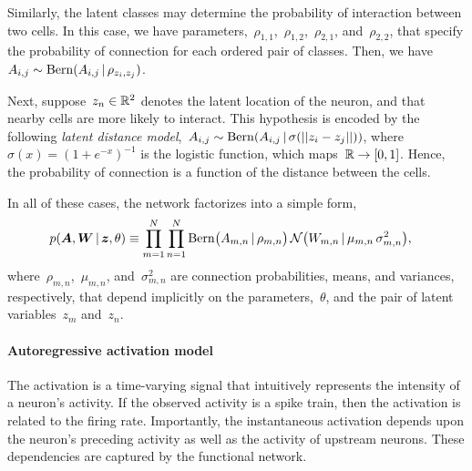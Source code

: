 Similarly, the latent classes may determine the probability of interaction between two cells. In this case, we have parameters,~$\rho_{1,1}$,~$\rho_{1,2}$,~$\rho_{2,1}$, and~$\rho_{2,2}$, that specify the probability of connection for each ordered pair of classes.
Then, we have~$A_{i,j} \sim \mathrm{Bern}(A_{i,j} \,|\, \rho_{z_i, z_j})$.

Next, suppose~$z_n \in \mathbb{R}^2$ denotes the latent location of the neuron, and that nearby cells are more likely to interact. 
This hypothesis is encoded by the following \emph{latent distance model},~${A_{i,j} \sim \mathrm{Bern}(A_{i,j} \,|\, \sigma(||z_i - z_j||))}$, where~$\sigma(x)=(1+e^{-x})^{-1}$ is the logistic function, which maps~$\mathbb{R} \to [0,1]$.
Hence, the probability of connection is a function of the distance between the cells.


In all of these cases, the network factorizes into a simple form,
\begin{align}
p(\boldsymbol{A}, \boldsymbol{W} \,|\, \boldsymbol{z}, \theta) &\equiv 
\prod_{m=1}^N \prod_{n=1}^N \mathrm{Bern} \big(A_{m,n} \,|\, \rho_{m,n} \big) \,
\mathcal{N} \big(W_{m,n} \,|\, \mu_{m,n}\, \sigma_{m,n}^2 \big),
\end{align}
where~$\rho_{m,n}$,~$\mu_{m,n}$, and~$\sigma_{m,n}^2$ are connection probabilities, means, and variances, respectively, that depend implicitly on the parameters,~$\theta$, and the pair of latent variables~$z_m$ and~$z_n$.

\paragraph{Autoregressive activation model}
The activation is a time-varying signal that intuitively represents the intensity of a neuron's activity. 
If the observed activity is a spike train, then the activation is related to the firing rate.
Importantly, the instantaneous activation depends upon the neuron's preceding activity as well as the activity of upstream neurons. 
These dependencies are captured by the functional network.

